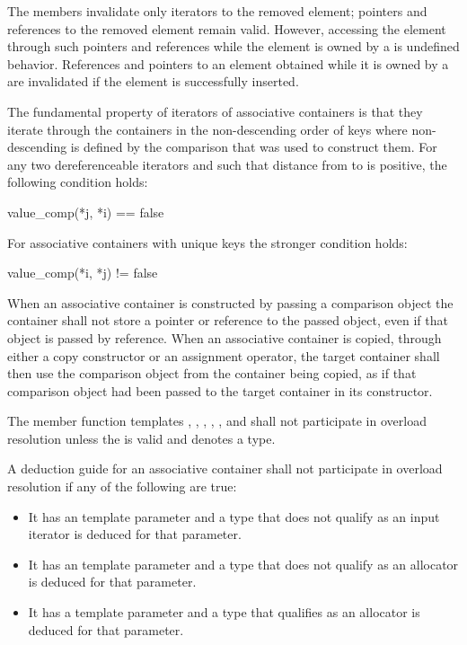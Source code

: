 \pnum
The  members invalidate only iterators to the removed element;
pointers and references to the removed element remain valid. However, accessing
the element through such pointers and references while the element is owned by
a  is undefined behavior. References and pointers to an element
obtained while it is owned by a  are invalidated if the element
is successfully inserted.

\pnum
The fundamental property of iterators of associative containers is that they iterate through the containers
in the non-descending order of keys where non-descending is defined by the comparison that was used to
construct them.
For any two dereferenceable iterators
and
such that distance from
to
is positive, the following condition holds:
\begin{codeblock}
value_comp(*j, *i) == false
\end{codeblock}

\pnum
For associative containers with unique keys the stronger condition holds:
\begin{codeblock}
value_comp(*i, *j) != false
\end{codeblock}

\pnum
When an associative container is constructed by passing a comparison object the
container shall not store a pointer or reference to the passed object,
even if that object is passed by reference.
When an associative container is copied, through either a copy constructor
or an assignment operator,
the target container shall then use the comparison object from the container
being copied,
as if that comparison object had been passed to the target container in
its constructor.

\pnum
The member function templates
, , ,
, , and 
shall not participate in overload resolution unless
the   is valid
and denotes a type.

\pnum
A deduction guide for an associative container shall not participate in overload resolution
if any of the following are true:
\begin{itemize}
\item It has an  template parameter
and a type that does not qualify as an input iterator is deduced for that parameter.

\item It has an  template parameter
and a type that does not qualify as an allocator is deduced for that parameter.

\item It has a  template parameter
and a type that qualifies as an allocator is deduced for that parameter.
\end{itemize}

